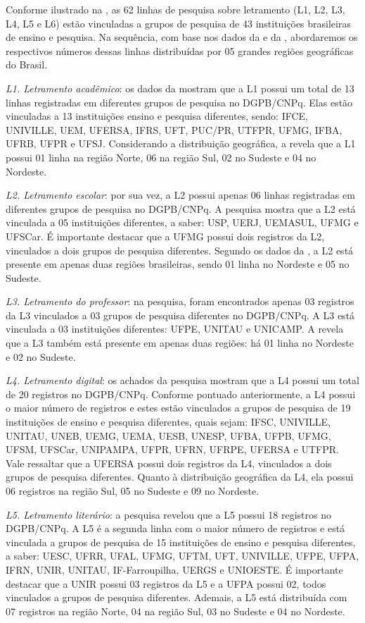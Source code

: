 \documentclass{textolivre}
\begin{document}
Conforme ilustrado na , as 62 linhas de pesquisa sobre letramento (L1, L2, L3, L4, L5 e L6) estão vinculadas a grupos de pesquisa de 43 instituições brasileiras de ensino e pesquisa. Na sequência, com base nos dados da  e da , abordaremos os respectivos números dessas linhas distribuídas por 05 grandes regiões geográficas do Brasil.

\textit{L1. Letramento acadêmico}: os dados da  mostram que a L1 possui um total de 13 linhas registradas em diferentes grupos de pesquisa no DGPB/CNPq. Elas estão vinculadas a 13 instituições ensino e pesquisa diferentes, sendo: IFCE, UNIVILLE, UEM, UFERSA, IFRS, UFT, PUC/PR, UTFPR, UFMG, IFBA, UFRB, UFPR e UFSJ. Considerando a distribuição geográfica, a  revela que a L1 possui 01 linha na região Norte, 06 na região Sul, 02 no Sudeste e 04 no Nordeste.

\textit{L2. Letramento escolar}: por sua vez, a L2 possui apenas 06 linhas registradas em diferentes grupos de pesquisa no DGPB/CNPq. A pesquisa mostra que a L2 está vinculada a 05 instituições diferentes, a saber: USP, UERJ, UEMASUL, UFMG e UFSCar. É importante destacar que a UFMG possui dois registros da L2, vinculados a dois grupos de pesquisa diferentes. Segundo os dados da , a L2 está presente em apenas duas regiões brasileiras, sendo 01 linha no Nordeste e 05 no Sudeste.

\textit{L3. Letramento do professor}: na pesquisa, foram encontrados apenas 03 registros da L3 vinculados a 03 grupos de pesquisa diferentes no DGPB/CNPq. A L3 está vinculada a 03 instituições diferentes: UFPE, UNITAU e UNICAMP. A  revela que a L3 também está presente em apenas duas regiões: há 01 linha no Nordeste e 02 no Sudeste.

\textit{L4. Letramento digital}: os achados da pesquisa mostram que a L4 possui um total de 20 registros no DGPB/CNPq. Conforme pontuado anteriormente, a L4 possui o maior número de registros e estes estão vinculados a grupos de pesquisa de 19 instituições de ensino e pesquisa diferentes, quais sejam: IFSC, UNIVILLE, UNITAU, UNEB, UEMG, UEMA, UESB, UNESP, UFBA, UFPB, UFMG, UFSM, UFSCar, UNIPAMPA, UFPR, UFRN, UFRPE, UFERSA e UTFPR. Vale ressaltar que a UFERSA possui dois registros da L4, vinculados a dois grupos de pesquisa diferentes. Quanto à distribuição geográfica da L4, ela possui 06 registros na região Sul, 05 no Sudeste e 09 no Nordeste.

\textit{L5. Letramento literário}: a pesquisa revelou que a L5 possui 18 registros no DGPB/CNPq. A L5 é a segunda linha com o maior número de registros e está vinculada a grupos de pesquisa de 15 instituições de ensino e pesquisa diferentes, a saber: UESC, UFRR, UFAL, UFMG, UFTM, UFT, UNIVILLE, UFPE, UFPA, IFRN, UNIR, UNITAU, IF-Farroupilha, UERGS e UNIOESTE. É importante destacar que a UNIR possui 03 registros da L5 e a UFPA possui 02, todos vinculados a grupos de pesquisa diferentes. Ademais, a L5 está distribuída com 07 registros na região Norte, 04 na região Sul, 03 no Sudeste e 04 no Nordeste.
\end{document}
